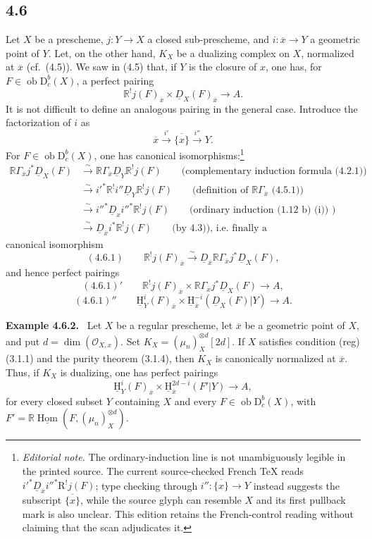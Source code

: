 \documentclass[11pt]{article}
\providecommand{\cO}{\mathcal{O}}
\providecommand{\uH}{\underline{\mathrm H}}
\providecommand{\uHom}{\underline{\Hom}}
\newenvironment{statement}[1]{\par\medskip\noindent\textbf{#1.}\ }{\par\medskip}
\DeclareMathOperator{\Hom}{Hom}
\newcommand{\R}{\mathrm{R}}
\newcommand{\D}{\mathrm{D}}
\newcommand{\ob}{\operatorname{ob}}
\newcommand{\ol}[1]{\overline{#1}}
\providecommand{\Hom}{\operatorname{Hom}}
\providecommand{\ob}{\operatorname{ob}}
\providecommand{\R}{\mathrm R}
\providecommand{\Hom}{\operatorname{Hom}}
\begin{document}
\subsection*{4.6}
Let $X$ be a prescheme, $j:Y\to X$ a closed sub-prescheme, and $i:\ol{x}\to Y$ a geometric point of $Y$. Let, on the other hand, $K_X$ be a dualizing complex on $X$, normalized at $\ol{x}$ (cf.~(4.5)). We saw in (4.5) that, if $Y$ is the closure of $x$, one has, for $F\in\ob\D_c^b(X)$, a perfect pairing
\[
\mathbb{R}^{!}j(F)_{\ol{x}}\times \underline{D}_X(F)_{\ol{x}}\longrightarrow A.
\]
It is not difficult to define an analogous pairing in the general case. Introduce the factorization of $i$ as
\[
\ol{x}\xrightarrow{i'}\ol{\{x\}}\xrightarrow{i''}Y.
\]
For $F\in\ob\D_c^b(X)$, one has canonical isomorphisms:\footnote{\emph{Editorial note.} The ordinary-induction line is not unambiguously legible in the printed source. The current source-checked French TeX reads $i'^*\underline D_{\ol{x}}i''^*\R^!j(F)$; type checking through $i'':\ol{\{x\}}\to Y$ instead suggests the subscript $\ol{\{x\}}$, while the source glyph can resemble $X$ and its first pullback mark is also unclear. This edition retains the French-control reading without claiming that the scan adjudicates it.}
\[
\begin{aligned}
\mathbb{R}\Gamma_{\ol{x}}j^*\underline{D}_X(F)&\xrightarrow{\sim}\mathbb{R}\Gamma_{\ol{x}}\underline{D}_Y\mathbb{R}^{!}j(F)\qquad\text{(complementary induction formula (4.2.1))}\\
&\xrightarrow{\sim}i'^*\mathbb{R}^{!}i''\underline{D}_Y\mathbb{R}^{!}j(F)\qquad\text{(definition of $\mathbb{R}\Gamma_{\ol{x}}$ (4.5.1))}\\
&\xrightarrow{\sim}i''^*\underline{D}_{{x}}i''^*\mathbb{R}^{!}j(F)\qquad\text{(ordinary induction (1.12 b) (i)) )}\\
&\xrightarrow{\sim}\underline{D}_{\ol{x}}i^*\mathbb{R}^{!}j(F)\qquad\text{(by 4.3)), i.e. finally a}
\end{aligned}
\]
canonical isomorphism
\[
(4.6.1)\qquad \mathbb{R}^{!}j(F)_{\ol{x}}\xrightarrow{\sim}\underline{D}_{\ol{x}}\mathbb{R}\Gamma_{\ol{x}}j^*\underline{D}_X(F),
\]
and hence perfect pairings
\[
(4.6.1)'\qquad \mathbb{R}^{!}j(F)_{\ol{x}}\times \mathbb{R}\Gamma_{\ol{x}}j^*\underline{D}_X(F)\longrightarrow A,
\]
\[
(4.6.1)''\qquad \uH_Y^i(F)_{\ol{x}}\times \uH_{\ol{x}}^{-i}(\underline{D}_X(F)|Y)\longrightarrow A.
\]

\begin{statement}{Example 4.6.2}
Let $X$ be a regular prescheme, let $\ol{x}$ be a geometric point of $X$, and put $d=\dim(\cO_{X,x})$. Set $K_X=(\mu_n)_X^{\otimes d}[2d]$. If $X$ satisfies condition (reg) (3.1.1) and the purity theorem (3.1.4), then $K_X$ is canonically normalized at $\ol{x}$. Thus, if $K_X$ is dualizing, one has perfect pairings
\[
\uH_Y^i(F)_{\ol{x}}\times \uH_{\ol{x}}^{2d-i}(F'|Y)\longrightarrow A,
\]
for every closed subset $Y$ containing $X$ and every $F\in\ob\D_c^b(X)$, with $F'=\mathbb{R}\uHom(F,(\mu_n)_X^{\otimes d})$.
\end{statement}
\end{document}
